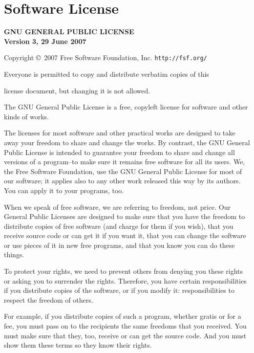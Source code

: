 \documentclass[12pt,a4paper]{book}
\begin{document}
\chapter{Software License}

\begin{center}
{\parindent 0in

\begin{center} 
\textbf{GNU GENERAL PUBLIC LICENSE} \\
\textbf{Version 3, 29 June 2007} \\
\end{center}

Copyright \copyright\  2007 Free Software Foundation, Inc. \texttt{http://fsf.org/}

\bigskip
Everyone is permitted to copy and distribute verbatim copies of this

license document, but changing it is not allowed.}

\end{center}

The GNU General Public License is a free, copyleft license for
software and other kinds of works.

The licenses for most software and other practical works are designed
to take away your freedom to share and change the works.  By contrast,
the GNU General Public License is intended to guarantee your freedom to
share and change all versions of a program--to make sure it remains free
software for all its users.  We, the Free Software Foundation, use the
GNU General Public License for most of our software; it applies also to
any other work released this way by its authors.  You can apply it to
your programs, too.

When we speak of free software, we are referring to freedom, not
price.  Our General Public Licenses are designed to make sure that you
have the freedom to distribute copies of free software (and charge for
them if you wish), that you receive source code or can get it if you
want it, that you can change the software or use pieces of it in new
free programs, and that you know you can do these things.

To protect your rights, we need to prevent others from denying you
these rights or asking you to surrender the rights.  Therefore, you have
certain responsibilities if you distribute copies of the software, or if
you modify it: responsibilities to respect the freedom of others.

For example, if you distribute copies of such a program, whether
gratis or for a fee, you must pass on to the recipients the same
freedoms that you received.  You must make sure that they, too, receive
or can get the source code.  And you must show them these terms so they
know their rights.
\end{document}
